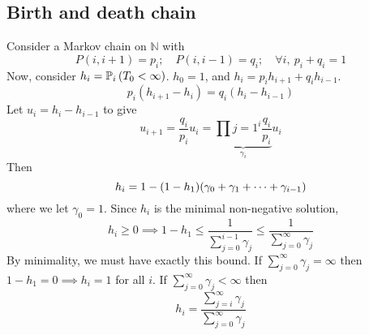 \subsection{Birth and death chain}
Consider a Markov chain on \( \mathbb N \) with
\[
	P(i,i+1) = p_i;\quad P(i,i-1) = q_i;\quad \forall i,\ p_i + q_i = 1
\]
Now, consider \( h_i = \mathbb{P}_{i}\left({T_0 < \infty}\right) \).
\( h_0 = 1 \), and \( h_i = p_i h_{i+1} + q_i h_{i-1} \).
\[
	p_i (h_{i+1} - h_i) = q_i (h_i - h_{i-1})
\]
Let \( u_i = h_i - h_{i-1} \) to give
\[
	u_{i+1} = \frac{q_i}{p_i} u_i = \underbrace{\prod{j=1}^i \frac{q_i}{p_i}}_{\gamma_i} u_i
\]
Then
\[
	h_i = 1 - (1 - h_1) \qty( \gamma_0 + \gamma_1 + \dots + \gamma_{i-1} )
\]
where we let \( \gamma_0 = 1 \).
Since \( h_i \) is the minimal non-negative solution,
\[
	h_i \geq 0 \implies 1 - h_1 \leq \frac{1}{\sum_{j=0}^{i-1} \gamma_j} \leq \frac{1}{\sum_{j=0}^{\infty} \gamma_j}
\]
By minimality, we must have exactly this bound.
If \( \sum_{j=0}^\infty \gamma_j = \infty \) then \( 1 - h_1 = 0 \implies h_i = 1 \) for all \( i \).
If \( \sum_{j=0}^\infty \gamma_j < \infty \) then
\[
	h_i = \frac{\sum_{j=i}^\infty \gamma_j}{\sum_{j=0}^\infty \gamma_j}
\]

